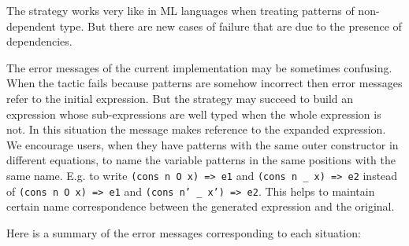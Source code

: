 \label{limitations}
The strategy works very like in ML languages when treating
patterns of non-dependent type.
But there are new cases of failure that are due to the presence of
dependencies.

The error messages of the current implementation may be sometimes
confusing.  When the tactic fails because patterns are somehow
incorrect then error messages refer to the initial expression. But the
strategy may succeed to build an expression whose sub-expressions are
well typed when the whole expression is not. In this situation the
message makes reference to the expanded expression.  We encourage
users, when they have patterns with the same outer constructor in
different equations, to name the variable patterns in the same
positions with the same name.
E.g. to write {\small\texttt{(cons n O x) => e1}}
and {\small\texttt{(cons n \_ x) => e2}} instead of
{\small\texttt{(cons n O x) => e1}} and
{\small\texttt{(cons n' \_ x') => e2}}.
This helps to maintain certain name correspondence between the
generated expression and the original.

Here is a summary of the error messages corresponding to each situation:

